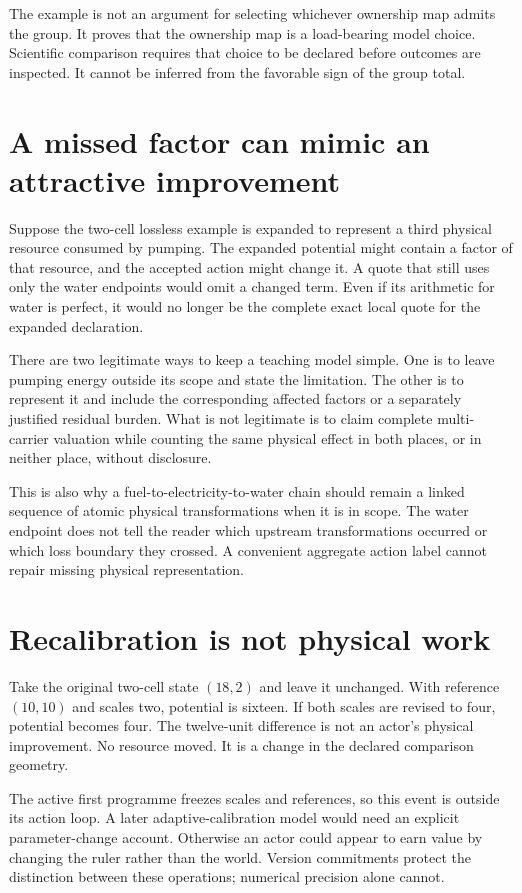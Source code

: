 The example is not an argument for selecting whichever ownership map
admits the group. It proves that the ownership map is a load-bearing model
choice. Scientific comparison requires that choice to be declared before
outcomes are inspected. It cannot be inferred from the favorable sign
of the group total.

\section{A missed factor can mimic an attractive improvement}
Suppose the two-cell lossless example is expanded to represent a third
physical resource consumed by pumping. The expanded potential might
contain a factor of that resource, and the accepted action might change
it. A quote that still uses only the water endpoints would omit a
changed term. Even if its arithmetic for water is perfect, it would no
longer be the complete exact local quote for the expanded declaration.

There are two legitimate ways to keep a teaching model simple. One is
to leave pumping energy outside its scope and state the limitation.
The other is to represent it and include the corresponding affected
factors or a separately justified residual burden. What is not legitimate
is to claim complete multi-carrier valuation while counting the same
physical effect in both places, or in neither place, without disclosure.

This is also why a fuel-to-electricity-to-water chain should remain a
linked sequence of atomic physical transformations when it is in scope.
The water endpoint does not tell the reader which upstream transformations
occurred or which loss boundary they crossed. A convenient aggregate
action label cannot repair missing physical representation.

\section{Recalibration is not physical work}
Take the original two-cell state $(18,2)$ and leave it unchanged.
With reference $(10,10)$ and scales two, potential is sixteen.
If both scales are revised to four, potential becomes four. The twelve-unit
difference is not an actor's physical improvement. No resource moved.
It is a change in the declared comparison geometry.

The active first programme freezes scales and references, so this event
is outside its action loop. A later adaptive-calibration model would need
an explicit parameter-change account. Otherwise an actor could appear
to earn value by changing the ruler rather than the world. Version
commitments protect the distinction between these operations; numerical
precision alone cannot.

